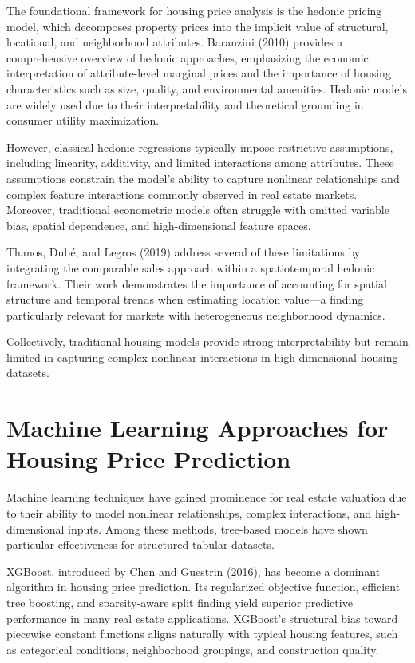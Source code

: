 \documentclass[12pt,a4paper,oneside,openany]{book}
\begin{document}
The foundational framework for housing price analysis is the hedonic pricing model, which decomposes property prices into the implicit value of structural, locational, and neighborhood attributes. Baranzini (2010) provides a comprehensive overview of hedonic approaches, emphasizing the economic interpretation of attribute-level marginal prices and the importance of housing characteristics such as size, quality, and environmental amenities. Hedonic models are widely used due to their interpretability and theoretical grounding in consumer utility maximization.

However, classical hedonic regressions typically impose restrictive assumptions, including linearity, additivity, and limited interactions among attributes. These assumptions constrain the model’s ability to capture nonlinear relationships and complex feature interactions commonly observed in real estate markets. Moreover, traditional econometric models often struggle with omitted variable bias, spatial dependence, and high-dimensional feature spaces.

Thanos, Dub\'e, and Legros (2019) address several of these limitations by integrating the comparable sales approach within a spatiotemporal hedonic framework. Their work demonstrates the importance of accounting for spatial structure and temporal trends when estimating location value---a finding particularly relevant for markets with heterogeneous neighborhood dynamics.

Collectively, traditional housing models provide strong interpretability but remain limited in capturing complex nonlinear interactions in high-dimensional housing datasets.

\section{Machine Learning Approaches for Housing Price Prediction}

Machine learning techniques have gained prominence for real estate valuation due to their ability to model nonlinear relationships, complex interactions, and high-dimensional inputs. Among these methods, tree-based models have shown particular effectiveness for structured tabular datasets.

XGBoost, introduced by Chen and Guestrin (2016), has become a dominant algorithm in housing price prediction. Its regularized objective function, efficient tree boosting, and sparsity-aware split finding yield superior predictive performance in many real estate applications. XGBoost’s structural bias toward piecewise constant functions aligns naturally with typical housing features, such as categorical conditions, neighborhood groupings, and construction quality.
\end{document}
